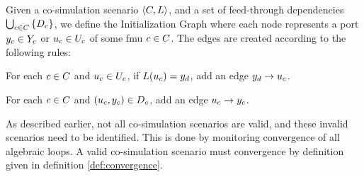 \documentclass[runningheads]{llncs}
\begin{document}
\begin{definition}\label{def:initialization_graph}
  Given a co-simulation scenario $ \left\langle C, L \right\rangle $, and a set of feed-through dependencies $\bigcup_{c \in C}  \left\{ D_{c} \right\}$, we define the Initialization Graph where each node represents a port $y_{c} \in Y_{c}$ or $u_{c} \in U_{c}$ of some fmu $c \in C$. The edges are created according to the following rules:
  \begin{compactenum}
    \item For each $c \in C$ and $u_{c} \in U_{c}$, if $L(u_{c}) = y_{d}$, add an edge $y_{d} -> u_{c}$.
    \item For each $c \in C$ and $(u_{c},y_{c}) \in D_{c}$, add an edge $u_{c} -> y_{c}$.
  \end{compactenum}
\end{definition}

As described earlier, not all co-simulation scenarios are valid, and these invalid scenarios need to be identified. This is done by monitoring convergence of all algebraic loops. A valid co-simulation scenario must convergence by definition given in definition \ref{def:convergence}.
\end{document}
